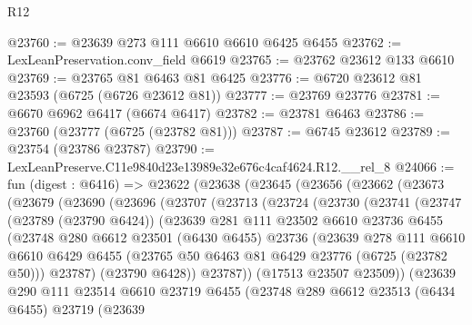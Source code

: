 \begin{lexlean}{R12}
\begin{coremodule}
@23760 := @23639 @273 @111 @6610 @6610 @6425 @6455
@23762 := LexLeanPreservation.conv_field @6619
@23765 := @23762 @23612 @133 @6610
@23769 := @23765 @81 @6463 @81 @6425
@23776 := @6720 @23612 @81 @23593 (@6725 (@6726 @23612 @81))
@23777 := @23769 @23776
@23781 := @6670 @6962 @6417 (@6674 @6417)
@23782 := @23781 @6463
@23786 := @23760 (@23777 (@6725 (@23782 @81)))
@23787 := @6745 @23612
@23789 := @23754 (@23786 @23787)
@23790 := LexLeanPreserve.C11e9840d23e13989e32e676c4caf4624.R12.__rel_8
@24066 := fun (digest : @6416) =>
  @23622
    (@23638
      (@23645
        (@23656
          (@23662
            (@23673
              (@23679
                (@23690
                  (@23696
                    (@23707
                      (@23713
                        (@23724
                          (@23730
                            (@23741
                              (@23747
                                (@23789 (@23790 @6424))
                                (@23639
                                  @281
                                  @111
                                  @23502
                                  @6610
                                  @23736
                                  @6455
                                  (@23748
                                    @280
                                    @6612
                                    @23501
                                    (@6430 @6455)
                                    @23736
                                    (@23639
                                      @278
                                      @111
                                      @6610
                                      @6610
                                      @6429
                                      @6455
                                      (@23765 @50 @6463 @81 @6429 @23776 (@6725 (@23782 @50)))
                                      @23787)
                                    (@23790 @6428))
                                  @23787))
                              (@17513 @23507 @23509))
                            (@23639
                              @290
                              @111
                              @23514
                              @6610
                              @23719
                              @6455
                              (@23748
                                @289
                                @6612
                                @23513
                                (@6434 @6455)
                                @23719
                                (@23639

\end{coremodule}
\end{lexlean}
